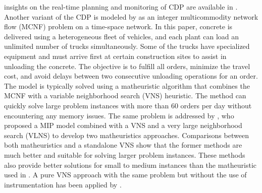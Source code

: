 \documentclass{article}
\begin{document}
insights on the real-time planning and monitoring of CDP are available in \cite{garza2021dynamic}. Another variant of the CDP is modeled by \cite{schmid2009hybrid} as an integer multicommodity network flow (MCNF) problem on a time-space network. In this paper, concrete is delivered using a heterogeneous fleet of vehicles, and each plant can load an unlimited number of trucks simultaneously. Some of the trucks have specialized equipment and must arrive first at certain construction sites to assist in unloading the concrete. The objective is to fulfill all orders, minimize the travel cost, and avoid delays between two consecutive unloading operations for an order. The model is typically solved using a matheuristic algorithm that combines the MCNF with a variable neighborhood search (VNS) heuristic. The method can quickly solve large problem instances with more than 60 orders per day without encountering any memory issues. The same problem is addressed by \cite{schmid2010hybridization}, who proposed a MIP model combined with a VNS and a very large neighborhood search (VLNS) to develop two matheuristics approaches. Comparisons between both matheuristics and a standalone VNS show that the former methods are much better and suitable for solving larger problem instances. These methods also provide better solutions for small to medium instances than the matheuristic used in \cite{schmid2009hybrid}. A pure VNS approach with the same problem but without the use of instrumentation has been applied by \cite{payr2009optimizing}.
\end{document}

